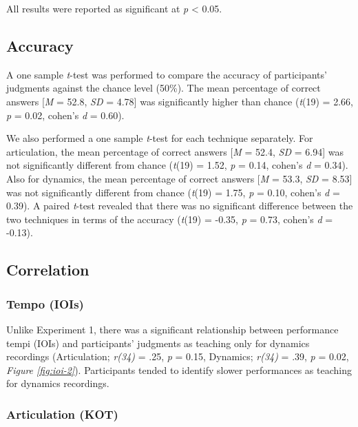 \documentclass[
  man,floatsintext]{apa6}
\begin{document}
All results were reported as significant at \emph{p} \textless{} 0.05.

\hypertarget{accuracy-2}{%
\subsection{Accuracy}\label{accuracy-2}}

A one sample \emph{t}-test was performed to compare the accuracy of participants' judgments against the chance level (50\%). The mean percentage of correct answers {[}\emph{M} = 52.8, \emph{SD} = 4.78{]} was significantly higher than chance (\emph{t}(19) = 2.66, \emph{p} = 0.02, cohen's \emph{d} = 0.60).

We also performed a one sample \emph{t}-test for each technique separately. For articulation, the mean percentage of correct answers {[}\emph{M} = 52.4, \emph{SD} = 6.94{]} was not significantly different from chance (\emph{t}(19) = 1.52, \emph{p} = 0.14, cohen's \emph{d} = 0.34). Also for dynamics, the mean percentage of correct answers {[}\emph{M} = 53.3, \emph{SD} = 8.53{]} was not significantly different from chance (\emph{t}(19) = 1.75, \emph{p} = 0.10, cohen's \emph{d} = 0.39). A paired \emph{t}-test revealed that there was no significant difference between the two techniques in terms of the accuracy (\emph{t}(19) = -0.35, \emph{p} = 0.73, cohen's \emph{d} = -0.13).

\hypertarget{correlation-1}{%
\subsection{Correlation}\label{correlation-1}}

\hypertarget{tempo-iois-1}{%
\subsubsection{Tempo (IOIs)}\label{tempo-iois-1}}

Unlike Experiment 1, there was a significant relationship between performance tempi (IOIs) and participants' judgments as teaching only for dynamics recordings (Articulation; \emph{r(34)} = .25, \emph{p} = 0.15, Dynamics; \emph{r(34)} = .39, \emph{p} = 0.02, \emph{Figure \ref{fig:ioi-2}}). Participants tended to identify slower performances as teaching for dynamics recordings.

\hypertarget{articulation-kot-1}{%
\subsubsection{Articulation (KOT)}\label{articulation-kot-1}}
\end{document}
